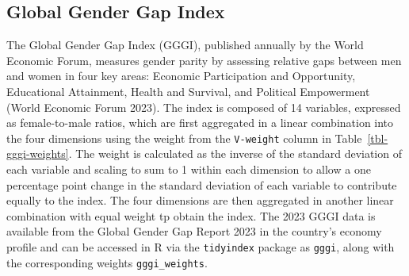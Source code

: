 \documentclass[
]{interact}
\begin{document}
\hypertarget{global-gender-gap-index}{%
\subsection{Global Gender Gap Index}\label{global-gender-gap-index}}

The Global Gender Gap Index (GGGI), published annually by the World
Economic Forum, measures gender parity by assessing relative gaps
between men and women in four key areas: Economic Participation and
Opportunity, Educational Attainment, Health and Survival, and Political
Empowerment (World Economic Forum 2023). The index is composed of 14
variables, expressed as female-to-male ratios, which are first
aggregated in a linear combination into the four dimensions using the
weight from the \texttt{V-weight} column in
Table~\ref{tbl-gggi-weights}. The weight is calculated as the inverse of
the standard deviation of each variable and scaling to sum to 1 within
each dimension to allow a one percentage point change in the standard
deviation of each variable to contribute equally to the index. The four
dimensions are then aggregated in another linear combination with equal
weight tp obtain the index. The 2023 GGGI data is available from the
Global Gender Gap Report 2023 in the country's economy profile and can
be accessed in R via the \texttt{tidyindex} package as \texttt{gggi},
along with the corresponding weights \texttt{gggi\_weights}.
\end{document}
